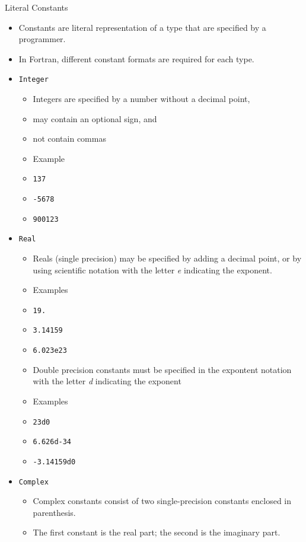 \documentclass[c,mathserif,compress,xcolor=svgnames]{beamer}
\newcommand{\lstfortran}[1]{\lstinline[language={[90]Fortran},basicstyle=\footnotesize\ttfamily]|#1|}
\begin{document}
\begin{frame}[allowframebreaks]{Literal Constants}
  \begin{itemize}
    \item Constants are literal representation of a type that are specified by a programmer.
    \item In Fortran, different constant formats are required for each type.
    \item[] \lstfortran{Integer}
    \begin{itemize}
      \item Integers are specified by a number without a decimal point,
      \item may contain an optional sign, and
      \item not contain commas
      \item Example
      \item[] \lstfortran{137}
      \item[] \lstfortran{-5678}
      \item[] \lstfortran{900123}
    \end{itemize}
    \framebreak
    \item[] \lstfortran{Real}
    \begin{itemize}
      \item Reals (single precision) may be specified by adding a decimal point, or by using scientific notation with the letter {\em e} indicating the exponent.
      \item Examples
      \item[] \lstfortran{19.}
      \item[] \lstfortran{3.14159}
      \item[] \lstfortran{6.023e23}
      \item Double precision constants must be specified in the expontent notation with the letter {\em d} indicating the exponent
      \item Examples
      \item[] \lstfortran{23d0}
      \item[] \lstfortran{6.626d-34}
      \item[] \lstfortran{-3.14159d0}
    \end{itemize}
    \framebreak
    \item[] \lstfortran{Complex}
    \begin{itemize}
      \item Complex constants consist of two single-precision constants enclosed in parenthesis.
      \item The first constant is the real part; the second is the imaginary part.

\end{itemize}
\end{itemize}
\end{frame}
\end{document}
